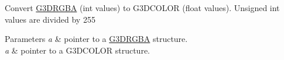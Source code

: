 Convert \hyperlink{structG3DRGBA}{G3\+D\+R\+G\+BA} (int values) to G3\+D\+C\+O\+L\+OR (float values). Unsigned int values are divided by 255 
\begin{DoxyParams}{Parameters}
{\em a} & pointer to a \hyperlink{structG3DRGBA}{G3\+D\+R\+G\+BA} structure. \\
\hline
{\em a} & pointer to a G3\+D\+C\+O\+L\+OR structure. \\
\hline
\end{DoxyParams}
